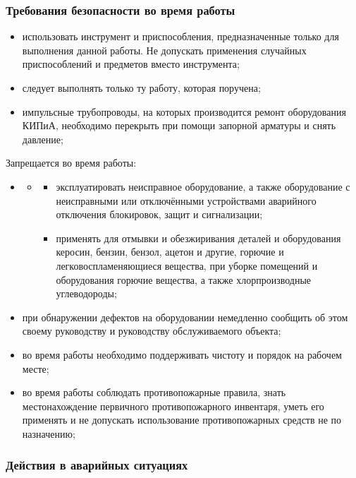 \subsubsection{Требования безопасности во время работы}
\begin{itemize}
\item использовать инструмент и приспособления, предназначенные только для выполнения данной работы. Не допускать применения случайных приспособлений и предметов вместо инструмента;
\item следует выполнять только ту работу, которая поручена;
\item импульсные трубопроводы, на которых производится ремонт оборудования КИПиА, необходимо перекрыть при помощи запорной арматуры и снять давление;
\end{itemize}
Запрещается во время работы:

\begin{itemize}
\item \begin{itemize}
\item \begin{itemize}
\item эксплуатировать неисправное оборудование, а также оборудование с неисправными или отключёнными устройствами аварийного отключения блокировок, защит и сигнализации;
\item применять для отмывки и обезжиривания деталей и оборудования керосин, бензин, бензол, ацетон и другие, горючие и легковоспламеняющиеся вещества, при уборке помещений и оборудования горючие вещества, а также хлорпроизводные углеводороды;
\end{itemize}
\end{itemize}
\end{itemize}
\begin{itemize}
\item при обнаружении дефектов на оборудовании немедленно сообщить об этом своему руководству и руководству обслуживаемого объекта;
\item во время работы необходимо поддерживать чистоту и порядок на рабочем месте;
\item во время работы соблюдать противопожарные правила, знать местонахождение первичного противопожарного инвентаря, уметь его применять и не допускать использование противопожарных средств не по назначению;
\end{itemize}
\subsubsection{Действия в аварийных ситуациях}

